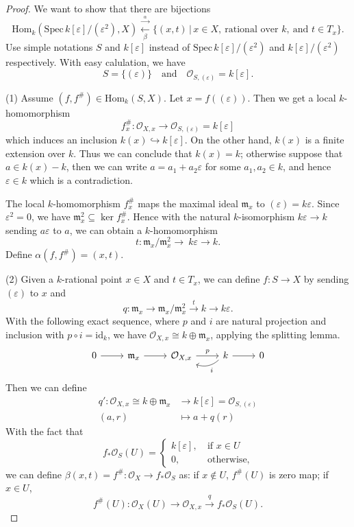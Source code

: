 \documentclass[12pt]{amsart}
\begin{document}
\begin{proof}
	We want to show that there are bijections$$\mathrm{Hom}_k\left(\mathrm{Spec}\,k[\varepsilon]/(\varepsilon^2),X\right)\stackrel{\xrightarrow{\alpha}}{\xleftarrow[\beta]{}}\{(x,t)\,|\,x\in X,\ \text{rational over }k ,\ \text{and }t\in T_x \}.$$Use simple notations $S$ and $k[\varepsilon]$ instead of $\mathrm{Spec}\,k[\varepsilon]/(\varepsilon^2)$ and $k[\varepsilon]/(\varepsilon^2)$ respectively. With easy calulation, we have$$S=\{(\varepsilon)\}\quad\text{and}\quad\mathcal{O}_{S,(\varepsilon)}=k[\varepsilon].$$
	
	(1) Assume $(f,f^\#)\in\mathrm{Hom}_k(S,X)$. Let $x=f((\varepsilon))$. Then we get a local $k$-homomorphism$$f^\#_x:\mathcal{O}_{X,x}\to\mathcal{O}_{S,(\varepsilon)}=k[\varepsilon]$$which induces an inclusion $k(x)\hookrightarrow k[\varepsilon]$. On the other hand, $k(x)$ is a finite extension over $k$. Thus we can conclude that $k(x)=k$; otherwise suppose that $a\in k(x)-k$, then we can write $a=a_1+a_2\varepsilon$ for some $a_1,a_2\in k$, and hence $\varepsilon\in k$ which is a contradiction.
	
	The local $k$-homomorphism $f_x^\#$ maps the maximal ideal $\mathfrak{m}_x$ to $(\varepsilon)=k\varepsilon$. Since $\varepsilon^2=0$, we have $\mathfrak{m}_x^2\subseteq\ker f^\#_x$. Hence with the natural $k$-isomorphism $k\varepsilon\to k$ sending $a\varepsilon$ to $a$, we can obtain a $k$-homomorphism$$t:\mathfrak{m}_x/\mathfrak{m}_x^2\to\ k\varepsilon\to k.$$Define $\alpha(f,f^\#)=(x,t)$.
	
	(2) Given a $k$-rational point $x\in X$ and $t\in T_x$, we can define $f:S\to X$ by sending $(\varepsilon)$ to $x$ and $$q:\mathfrak{m}_x\to\mathfrak{m}_x/\mathfrak{m}_x^2\xrightarrow{t}k\to k\varepsilon.$$With the following exact sequence, where $p$ and $i$ are natural projection and inclusion with $p\circ i=\mathrm{id}_k$, we have $\mathcal{O}_{X,x}\cong k\oplus\mathfrak{m}_x$, applying the splitting lemma.
	\begin{equation*}
	\begin{tikzcd}
	0 \arrow[r] & \mathfrak{m}_x \arrow[r] & {\mathcal{O}_{X,x}} \arrow[r, "p"] & k \arrow[r] \arrow[l, "i", bend left] & 0
	\end{tikzcd}
	\end{equation*}
	Then we can define
	\begin{align*}
	q':\mathcal{O}_{X,x}\cong k\oplus\mathfrak{m}_x&\to k[\varepsilon]=\mathcal{O}_{S,(\varepsilon)}\\
	(a,r)&\mapsto a+q(r)
	\end{align*}
	With the fact that
	\begin{equation*}
	f_*\mathcal{O}_S(U)=\left\{\begin{matrix}
	k[\varepsilon],\ &\text{if }x\in U\\
	0,\ &\text{otherwise},
	\end{matrix}
	\right.
	\end{equation*}
	we can define $\beta(x,t)=f^\#:\mathcal{O}_X\to f_*\mathcal{O}_S$ as: if $x\notin U$, $f^\#(U)$ is zero map; if $x\in U$,$$f^\#(U):\mathcal{O}_X(U)\to\mathcal{O}_{X,x}\xrightarrow{q}f_*\mathcal{O}_S(U).$$
	

\end{proof}
\end{document}
